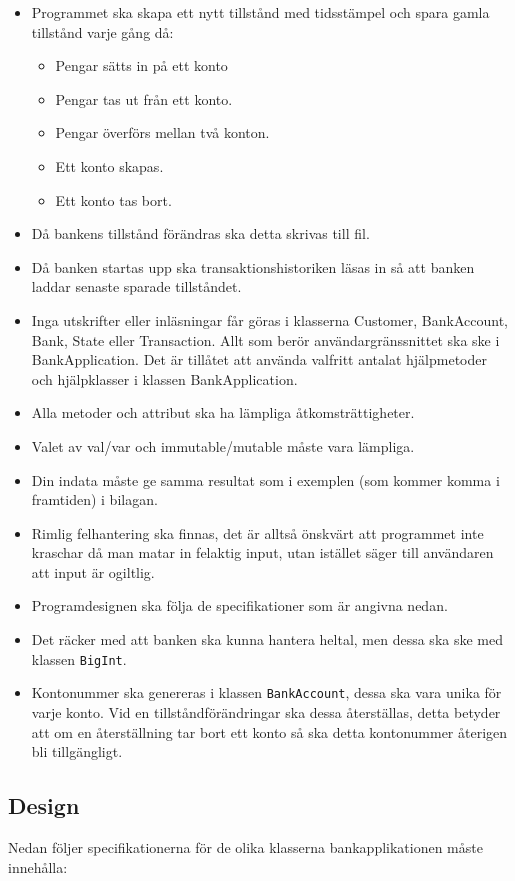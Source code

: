 \begin{itemize}
\item Programmet ska skapa ett nytt tillstånd med tidsstämpel och spara gamla tillstånd varje gång då:
\begin{itemize}
\item Pengar sätts in på ett konto
\item Pengar tas ut från ett konto.
\item Pengar överförs mellan två konton.
\item Ett konto skapas.
\item Ett konto tas bort.
\end{itemize}
\item Då bankens tillstånd förändras ska detta skrivas till fil.
\item Då banken startas upp ska transaktionshistoriken läsas in så att banken laddar senaste sparade tillståndet.
\item Inga utskrifter eller inläsningar får göras i klasserna Customer, BankAccount, Bank, State eller Transaction. Allt som berör användargränssnittet ska ske i BankApplication. Det är tillåtet att använda valfritt antalat hjälpmetoder och hjälpklasser i klassen BankApplication.
\item Alla metoder och attribut ska ha lämpliga åtkomsträttigheter.
\item Valet av val/var och immutable/mutable måste vara lämpliga.
\item Din indata måste ge samma resultat som i exemplen (som kommer komma i framtiden) i bilagan.
\item Rimlig felhantering ska finnas, det är alltså önskvärt att programmet inte kraschar då man matar in felaktig input, utan istället säger till användaren att input är ogiltlig.
\item Programdesignen ska följa de specifikationer som är angivna nedan.
\item Det räcker med att banken ska kunna hantera heltal, men dessa ska ske med klassen \texttt{BigInt}.
\item Kontonummer ska genereras i klassen \texttt{BankAccount}, dessa ska vara unika för varje konto. Vid en tillståndförändringar ska dessa återställas, detta betyder att om en återställning tar bort ett konto så ska detta kontonummer återigen bli tillgängligt.
\end{itemize}

\subsection{Design}
Nedan följer specifikationerna för de olika klasserna bankapplikationen måste innehålla:

